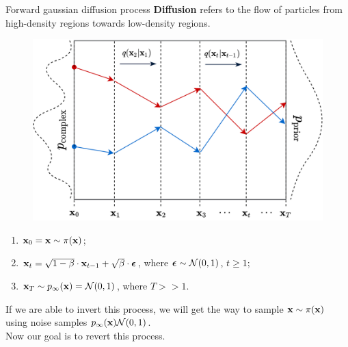\begin{frame}{Forward gaussian diffusion process}
	\textbf{Diffusion} refers to the flow of particles from high-density regions towards low-density regions.
	\vspace{-0.2cm}
	\begin{figure}
		\includegraphics[width=0.5\linewidth]{figs/diffusion_over_time}
	\end{figure}
	\vspace{-0.6cm}
	\begin{enumerate}
		\item $\mathbf{x}_0 = \mathbf{x} \sim \pi(\mathbf{x})$;
		\item $\mathbf{x}_t = \sqrt{1 - \beta} \cdot \mathbf{x}_{t - 1} + \sqrt{\beta} \cdot \boldsymbol{\epsilon}$, where $\boldsymbol{\epsilon} \sim \mathcal{N}(0, 1)$, $t \geq 1$;
		\item $\mathbf{x}_T \sim p_{\infty}(\mathbf{x}) = \mathcal{N}(0, 1)$, where $T >> 1$.
	\end{enumerate}
	If we are able to invert this process, we will get the way to sample $\mathbf{x} \sim \pi(\mathbf{x})$ using noise samples $p_{\infty}(\mathbf{x})\mathcal{N}(0, 1)$. \\ 
	Now our goal is to revert this process.
\end{frame}
